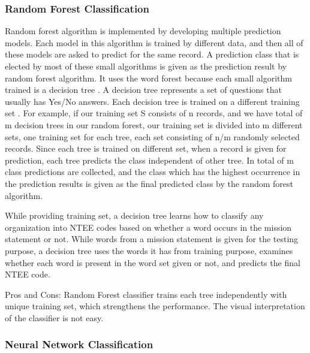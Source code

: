 \documentclass[12pt]{article}
\begin{document}
\subsubsection{Random Forest Classification}

Random forest algorithm is implemented by developing multiple prediction models. Each model in this algorithm is trained by different data, and then all of these models are asked to predict for the same record. A prediction class that is elected by most of these small algorithms is given as the prediction result by random forest algorithm. It uses the word forest because each small algorithm trained is a decision tree \parencites[83]{quinlan1986induction}. A decision tree represents a set of questions that usually has Yes/No answers. Each decision tree is trained on a different training set \parencites[124]{breiman1996bagging}. For example, if our training set S consists of n records, and we have total of m decision trees in our random forest, our training set is divided into m different sets, one training set for each tree, each set consisting of n/m randomly selected records. Since each tree is trained on different set, when a record is given for prediction, each tree predicts the class independent of other tree. In total of m class predictions are collected, and the class which has the highest occurrence in the prediction results is given as the final predicted class by the random forest algorithm. 

While providing training set, a decision tree learns how to classify any organization into NTEE codes based on whether a word occurs in the mission statement or not. While words from a mission statement is given for the testing purpose, a decision tree uses the words it has from training purpose, examines whether each word is present in the word set given or not, and predicts the final NTEE code.

Pros and Cons: Random Forest classifier trains each tree independently with unique training set, which strengthens the performance. The visual interpretation of the classifier is not easy.


\subsubsection{Neural Network Classification}
\end{document}
